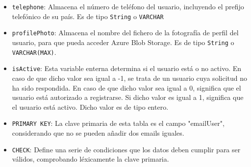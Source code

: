 \begin{itemize}
\begin{itemize}
        \item \texttt{telephone}: Almacena el número de teléfono del usuario,
        incluyendo el prefijo telefónico de su país. Es de tipo \texttt{String} o
        \texttt{VARCHAR}
        \item \texttt{profilePhoto}: Almacena el nombre del fichero de la fotografía de perfil del usuario, para que pueda acceder Azure Blob Storage. Es de tipo \texttt{String} o \texttt{VARCHAR(MAX)}.
        \item \texttt{isActive}: Esta variable enterna determina si el usuario está o no activo. En caso de que dicho valor sea igual a -1, se trata de un usuario cuya solicitud no ha sido respondida. En caso de que dicho valor sea igual a 0, significa que el usuario está autorizado a registrarse. Si dicho valor es igual a 1, significa que el usuario está activo. Dicho valor es de tipo entero.
        \item \texttt{PRIMARY KEY}: La clave primaria de esta tabla es el campo "emailUser", considerando que no se pueden añadir dos emails iguales.
        \item \texttt{CHECK}: Define una serie de condiciones que los datos deben cumplir para ser válidos, comprobando léxicamente la clave primaria.
      \end{itemize}

      


\end{itemize}
